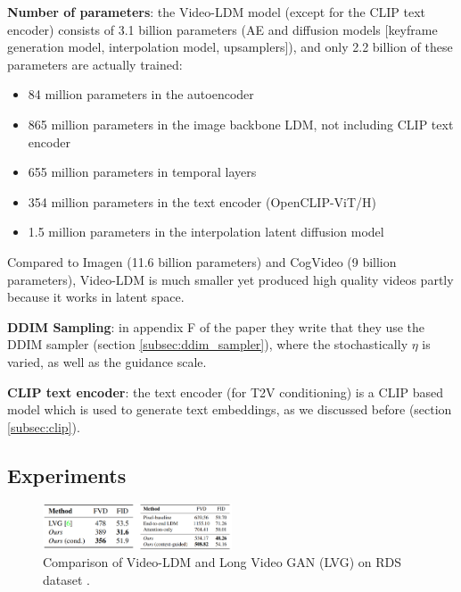 \textbf{Number of parameters}: the Video-LDM model (except for the CLIP text encoder) consists of 3.1 billion parameters (AE and diffusion models [keyframe generation model, interpolation model, upsamplers]), and only 2.2 billion of these parameters are actually trained:

\begin{itemize}
    \item 84 million parameters in the autoencoder
    \item 865 million parameters in the image backbone LDM, not including CLIP text encoder
    \item 655 million parameters in temporal layers
    \item 354 million parameters in the text encoder (OpenCLIP-ViT/H)
    \item 1.5 million parameters in the interpolation latent diffusion model
\end{itemize}

Compared to Imagen (11.6 billion parameters) and CogVideo (9 billion parameters), Video-LDM is much smaller yet produced high quality videos partly because it works in latent space.

\textbf{DDIM Sampling}: in appendix F of the paper they write that they use the DDIM sampler \cite{ddim} (section \ref{subsec:ddim_sampler}), where the stochastically $\eta$ is varied, as well as the guidance scale.

\textbf{CLIP text encoder}: the text encoder (for T2V conditioning) is a CLIP \cite{openai_clip} based model which is used to generate text embeddings, as we discussed before (section \ref{subsec:clip}).










\subsection{Experiments}

\begin{figure}
    \centering
    \includegraphics[width=0.5\textwidth]{images/video_ldm/videoldm_vs_lvg_on_rds.png}
    \caption{Comparison of Video-LDM and Long Video GAN (LVG) on RDS dataset \cite{video_ldm}.}
    \label{fig:video_ldm_vs_lvg_on_rds}
\end{figure}

